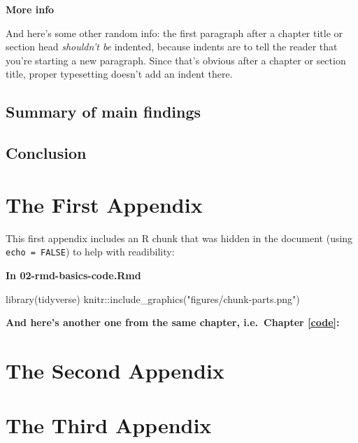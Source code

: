 \documentclass[a4paper, twoside]{templates/ociamthesis}
\newenvironment{Shaded}{\begin{snugshade}}{\end{snugshade}}
\newcommand{\FunctionTok}[1]{\textcolor[rgb]{0.00,0.00,0.00}{#1}}
\newcommand{\NormalTok}[1]{#1}
\newcommand{\SpecialCharTok}[1]{\textcolor[rgb]{0.00,0.00,0.00}{#1}}
\newcommand{\StringTok}[1]{\textcolor[rgb]{0.31,0.60,0.02}{#1}}
\renewenvironment{Shaded}
{
  \vspace{4pt}%
  \begin{snugshade}%
}{%
  \end{snugshade}%
  \vspace{4pt}%
}
\begin{document}
\textbf{More info}

And here's some other random info: the first paragraph after a chapter title or section head \emph{shouldn't be} indented, because indents are to tell the reader that you're starting a new paragraph. Since that's obvious after a chapter or section title, proper typesetting doesn't add an indent there.

\hypertarget{summary-of-main-findings}{%
\section*{Summary of main findings}\label{summary-of-main-findings}}

\hypertarget{conclusion-3}{%
\section*{Conclusion}\label{conclusion-3}}

\startappendices

\hypertarget{the-first-appendix}{%
\chapter{The First Appendix}\label{the-first-appendix}}

This first appendix includes an R chunk that was hidden in the document (using \texttt{echo\ =\ FALSE}) to help with readibility:

\textbf{In 02-rmd-basics-code.Rmd}

\begin{Shaded}
\begin{Highlighting}[]
\FunctionTok{library}\NormalTok{(tidyverse)}
\NormalTok{knitr}\SpecialCharTok{::}\FunctionTok{include\_graphics}\NormalTok{(}\StringTok{"figures/chunk{-}parts.png"}\NormalTok{)}
\end{Highlighting}
\end{Shaded}

\textbf{And here's another one from the same chapter, i.e.~Chapter \ref{code}:}

\hypertarget{the-second-appendix}{%
\chapter{The Second Appendix}\label{the-second-appendix}}

\hypertarget{the-third-appendix}{%
\chapter{The Third Appendix}\label{the-third-appendix}}
\end{document}
